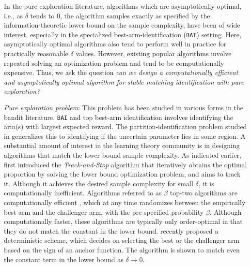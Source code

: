\documentclass{article}
\begin{document}
In the pure-exploration literature, algorithms which are asymptotically optimal, i.e., as $\delta$ tends to 0, the algorithm samples exactly as specified by the information-theoretic lower bound on the sample complexity, have been of wide interest, especially in the specialized best-arm-identification (\texttt{BAI}) setting. Here, asymptotically optimal algorithms also tend to perform well in practice for practically reasonable $\delta$ values. However, existing popular algorithms \cite{garivier2016optimal} involve repeated solving an optimization problem and tend to be computationally expensive. Thus, we ask the question \textit{ can we design a computationally efficient and asymptotically optimal algorithm for stable matching identification with pure exploration?}

\textit{Pure exploration problem}:  This problem has been studied in various forms in the bandit literature. \texttt{BAI} \cite{garivier2016optimal} and top best-arm identification  \cite{you2023information} involves identifying the arm(s) with largest expected reward. The partition-identification problem studied in \cite{juneja2019sample} generalizes this to identifying if the uncertain parameter lies in some region. A substantial amount of interest in the learning theory community is in designing algorithms that match the lower-bound sample complexity. As indicated earlier, \cite{garivier2016optimal} first introduced the \textit{Track-and-Stop} algorithm that iteratively obtains the optimal proportion by solving the lower bound optimization problem, and aims to track it. Although it achieves the desired sample complexity for small $\delta$, it is computationally inefficient. Algorithms referred to as $\beta$ top-two algorithms are computationally efficient \cite{russo2020simple,jourdan2022top}, which at any time randomizes between the empirically best arm and the challenger arm, with the pre-specified probability $\beta$. Although computationally faster, these algorithms are typically only order-optimal in that they do not match the constant in the lower bound. \cite{bandyopadhyay2024optimal} recently proposed a deterministic scheme, which decides on selecting the best or the challenger arm based on the sign of an anchor function. The algorithm is shown to match even the constant term in the lower bound as $\delta \rightarrow 0$.
\end{document}
